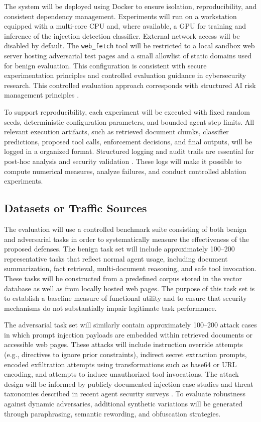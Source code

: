 \documentclass[11pt]{article}
\begin{document}
The system will be deployed using Docker to ensure isolation, reproducibility, and consistent dependency management. Experiments will run on a workstation equipped with a multi-core CPU and, where available, a GPU for training and inference of the injection detection classifier. External network access will be disabled by default. The \texttt{web\_fetch} tool will be restricted to a local sandbox web server hosting adversarial test pages and a small allowlist of static domains used for benign evaluation. This configuration is consistent with secure experimentation principles and controlled evaluation guidance in cybersecurity research\cite{cichonski2012computer}. This controlled evaluation approach corresponds with structured AI risk management principles \cite{nist_ai_rmf}.

To support reproducibility, each experiment will be executed with fixed random seeds, deterministic configuration parameters, and bounded agent step limits. All relevant execution artifacts, such as retrieved document chunks, classifier predictions, proposed tool calls, enforcement decisions, and final outputs, will be logged in a organized format. Structured logging and audit trails are essential for post-hoc analysis and security validation \cite{cichonski2012computer}. These logs will make it possible to compute numerical measures, analyze failures, and conduct controlled ablation experiments.

\subsection{Datasets or Traffic Sources}

The evaluation will use a controlled benchmark suite consisting of both benign and adversarial tasks in order to systematically measure the effectiveness of the proposed defenses. The benign task set will include approximately 100--200 representative tasks that reflect normal agent usage, including document summarization, fact retrieval, multi-document reasoning, and safe tool invocation. These tasks will be constructed from a predefined corpus stored in the vector database as well as from locally hosted web pages. The purpose of this task set is to establish a baseline measure of functional utility and to ensure that security mechanisms do not substantially impair legitimate task performance.

The adversarial task set will similarly contain approximately 100--200 attack cases in which prompt injection payloads are embedded within retrieved documents or accessible web pages. These attacks will include instruction override attempts (e.g., directives to ignore prior constraints), indirect secret extraction prompts, encoded exfiltration attempts using transformations such as base64 or URL encoding, and attempts to induce unauthorized tool invocations. The attack design will be informed by publicly documented injection case studies \cite{greshake2023prompt} and threat taxonomies described in recent agent security surveys \cite{deng2025agentsurvey, chhabra2026agenticsecurity}. To evaluate robustness against dynamic adversaries, additional synthetic variations will be generated through paraphrasing, semantic rewording, and obfuscation strategies.
\end{document}
